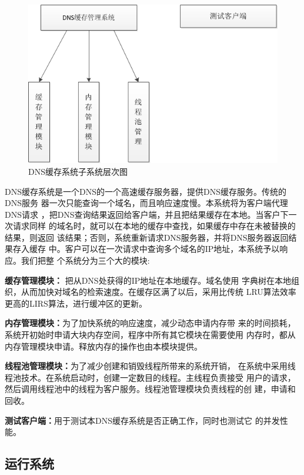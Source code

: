 \documentclass[12pt, a4paper, titlepage]{article}
\begin{document}
\begin{figure}[H]
\centering
\includegraphics[keepaspectratio, scale=0.9]{pitures/zixitongcengcitu.png}
\caption{DNS缓存系统子系统层次图}
\end{figure}
\indent DNS缓存系统是一个DNS的一个高速缓存服务器，提供DNS缓存服务。传统的DNS服务
	器一次只能查询一个域名，而且响应速度慢。本系统将为客户端代理DNS请求
	，把DNS查询结果返回给客户端，并且把结果缓存在本地。当客户下一次请求同样
	的域名时，就可以在本地的缓存中查找，如果缓存中存在未被替换的结果，则返回
	该结果；否则，系统重新请求DNS服务器，并将DNS服务器返回结果存入缓存
	中。客户可以在一次请求中查询多个域名的IP地址，本系统予以响应。我们把整
	个系统分为三个大的模块:
	\begin{compactitem}
	\item{\textbf{缓存管理模块：} 把从DNS处获得的IP地址在本地缓存。域名使用
	字典树\cite{IDAT}在本地组织，从而加快对域名的检索速度。在缓存区满了以后，采用比传统
	LRU算法效率更高的LIRS\cite{LIRS}算法，进行缓冲区的更新。}
	\item{\textbf{内存管理模块：}为了加快系统的响应速度，减少动态申请内存带
	来的时间损耗，系统开初始时申请大块内存空间，程序中所有其它模块在需要使用
	内存时，都从内存管理模块申请。释放内存的操作也由本模块提供。}
	\item{\textbf{线程池管理模块：}为了减少创建和销毁线程所带来的系统开销，
	在系统中采用线程池技术。在系统启动时，创建一定数目的线程。主线程负责接受
	用户的请求，然后调用线程池中的线程为客户服务。线程池管理模块负责线程的创
	建，申请和回收。}
	\item{\textbf{测试客户端：}用于测试本DNS缓存系统是否正确工作，同时也测试它
	的并发性能。}
	\end{compactitem}
\subsection{运行系统}
\end{document}
